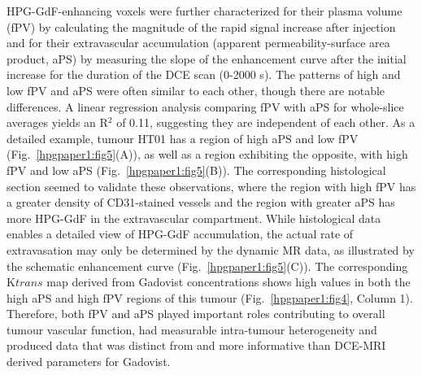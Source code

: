 HPG-GdF-enhancing voxels were further characterized for their plasma volume (fPV) by calculating the magnitude of the rapid signal increase after injection and for their extravascular accumulation (apparent permeability-surface area product, \acs{aPS}) by measuring the slope of the enhancement curve after the initial increase for the duration of the DCE scan (0-2000 s).
The patterns of high and low \acs{fPV} and \acs{aPS} were often similar to each other, though there are notable differences.
A linear regression analysis comparing \acs{fPV} with \acs{aPS} for whole-slice averages yields an R$^2$ of 0.11, suggesting they are independent of each other.
As a detailed example, tumour HT01 has a region of high \acs{aPS} and low \acs{fPV} (Fig.~\ref{hpgpaper1:fig5}(A)), as well as a region exhibiting the opposite, with high \acs{fPV} and low \acs{aPS} (Fig.~\ref{hpgpaper1:fig5}(B)).
The corresponding histological section seemed to validate these observations, where the region with high \acs{fPV} has a greater density of \acs{CD31}-stained vessels and the region with greater \acs{aPS} has more \acs{HPG-GdF} in the extravascular compartment.
While histological data enables a detailed view of \acs{HPG-GdF} accumulation, the actual rate of extravasation may only be determined by the dynamic MR data, as illustrated by the schematic enhancement curve (Fig.~\ref{hpgpaper1:fig5}(C)).
The corresponding K${trans}$ map derived from Gadovist concentrations shows high values in both the high \acs{aPS} and high \acs{fPV} regions of this tumour (Fig.~\ref{hpgpaper1:fig4}, Column 1).
Therefore, both \acs{fPV} and \acs{aPS} played important roles contributing to overall tumour vascular function, had measurable intra-tumour heterogeneity and produced data that was distinct from and more informative than DCE-MRI derived parameters for Gadovist.
